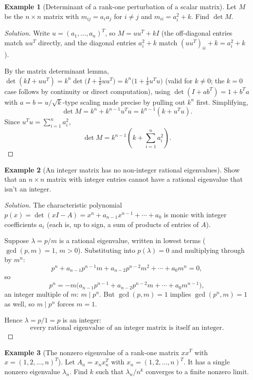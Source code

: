 \documentclass[11pt]{article}
\theoremstyle{definition}
\newtheorem{example}{Example}[section]
\begin{document}
\begin{example}[Determinant of a rank-one perturbation of a scalar matrix]
Let $M$ be the $n\times n$ matrix with $m_{ij}=a_ia_j$ for $i\ne j$ and $m_{ii}=a_i^2+k$. Find $\det M$.
\end{example}
\begin{proof}[Solution]
Write $u=(a_1,\dots,a_n)^T$, so $M=uu^T+kI$ (the off-diagonal entries match $uu^T$ directly, and the diagonal entries $a_i^2+k$ match $(uu^T)_{ii}+k=a_i^2+k$).

By the matrix determinant lemma, $\det(kI+uu^T)=k^n\det\bigl(I+\tfrac1k uu^T\bigr)=k^n\bigl(1+\tfrac1k u^Tu\bigr)$ (valid for $k\ne0$; the $k=0$ case follows by continuity or direct computation), using $\det(I+ab^T)=1+b^Ta$ with $a=b=u/\sqrt k$-type scaling made precise by pulling out $k^n$ first. Simplifying,
\[
\det M=k^n+k^{n-1}u^Tu=k^{n-1}(k+u^Tu).
\]
Since $u^Tu=\sum_{i=1}^na_i^2$,
\[
\boxed{\det M=k^{n-1}\left(k+\sum_{i=1}^na_i^2\right)}.
\]
\end{proof}

\begin{example}[An integer matrix has no non-integer rational eigenvalues]
Show that an $n\times n$ matrix with integer entries cannot have a rational eigenvalue that isn't an integer.
\end{example}
\begin{proof}[Solution]
The characteristic polynomial $p(x)=\det(xI-A)=x^n+a_{n-1}x^{n-1}+\cdots+a_0$ is monic with integer coefficients $a_i$ (each is, up to sign, a sum of products of entries of $A$).

Suppose $\lambda=p/m$ is a rational eigenvalue, written in lowest terms ($\gcd(p,m)=1$, $m>0$). Substituting into $p(\lambda)=0$ and multiplying through by $m^n$:
\[
p^n+a_{n-1}p^{n-1}m+a_{n-2}p^{n-2}m^2+\cdots+a_0m^n=0,
\]
so
\[
p^n=-m\bigl(a_{n-1}p^{n-1}+a_{n-2}p^{n-2}m+\cdots+a_0m^{n-1}\bigr),
\]
an integer multiple of $m$: $m\mid p^n$. But $\gcd(p,m)=1$ implies $\gcd(p^n,m)=1$ as well, so $m\mid p^n$ forces $m=1$.

Hence $\lambda=p/1=p$ is an integer:
\[
\boxed{\text{every rational eigenvalue of an integer matrix is itself an integer}}.
\]
\end{proof}

\begin{example}[The nonzero eigenvalue of a rank-one matrix $xx^T$ with $x=(1,2,\dots,n)^T$]
Let $A_n=x_nx_n^T$ with $x_n=(1,2,\dots,n)^T$. It has a single nonzero eigenvalue $\lambda_n$. Find $k$ such that $\lambda_n/n^k$ converges to a finite nonzero limit.
\end{example}
\end{document}
